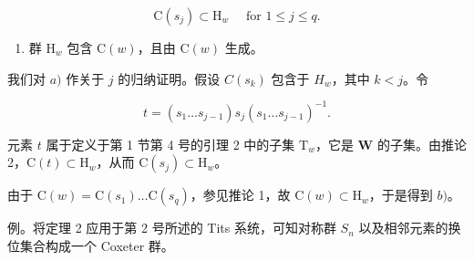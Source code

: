 \[
\mathrm{C} (s _ {j}) \subset \mathrm{H} _ {w} \quad \text { for } 1 \leqslant j \leqslant q.
\]

\begin{enumerate}
\def\labelenumi{\alph{enumi})}
\setcounter{enumi}{1}
\tightlist
\item
  群 \(\mathrm{H}_w\) 包含 \(\mathrm{C}(w)\)，且由 \(\mathrm{C}(w)\) 生成。
\end{enumerate}

我们对 \(a)\) 作关于 \(j\) 的归纳证明。假设 \(C(s_k)\) 包含于 \(H_w\)，其中 \(k < j\)。令

\[
t = (s _ {1} \dots s _ {j - 1}) s _ {j} (s _ {1} \dots s _ {j - 1}) ^ {- 1}.
\]

元素 \(t\) 属于定义于第 1 节第 4 号的引理 2 中的子集 \(\mathrm{T}_w\)，它是 \(\mathbf{W}\) 的子集。由推论 2，\(\mathrm{C}(t) \subset \mathrm{H}_w\)，从而 \(\mathrm{C}(s_j) \subset \mathrm{H}_w\)。

由于 \(\mathrm{C}(w) = \mathrm{C}(s_1) \ldots \mathrm{C}(s_q)\)，参见推论 1，故 \(\mathrm{C}(w) \subset \mathrm{H}_w\)，于是得到 \(b)\)。

例。将定理 2 应用于第 2 号所述的 Tits 系统，可知对称群 \(S_{n}\) 以及相邻元素的换位集合构成一个 Coxeter 群。


